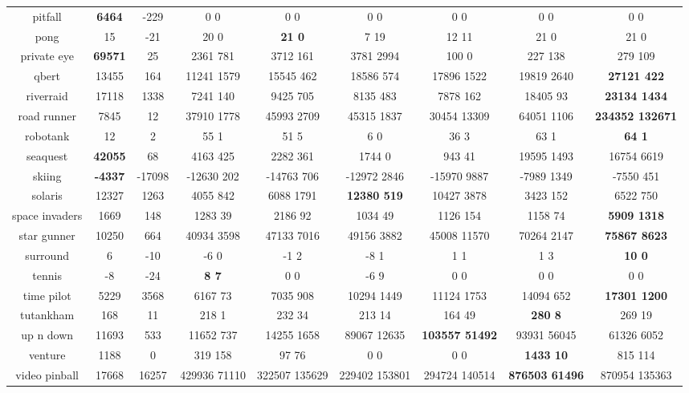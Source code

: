 \documentclass{article}
\begin{document}
\begin{table}[!ht]
\begin{tabular}{|c|c|c|c|c|c|c|c|c|}
 pitfall & \bf{6464} & -229 & 0  0 & 0  0 & 0  0 & 0  0 & 0  0 & 0  0 \\
 pong & 15 & -21 & 20  0 & \bf{21  0} & 7  19 & 12  11 & 21  0 & 21  0 \\
 private eye & \bf{69571} & 25 & 2361  781 & 3712  161 & 3781  2994 & 100  0 & 227  138 & 279  109 \\
 qbert & 13455 & 164 & 11241  1579 & 15545  462 & 18586  574 & 17896  1522 & 19819  2640 & \bf{27121  422} \\
 riverraid & 17118 & 1338 & 7241  140 & 9425  705 & 8135  483 & 7878  162 & 18405  93 & \bf{23134  1434} \\
 road runner & 7845 & 12 & 37910  1778 & 45993  2709 & 45315  1837 & 30454  13309 & 64051  1106 & \bf{234352  132671} \\
 robotank & 12 & 2 & 55  1 & 51  5 & 6  0 & 36  3 & 63  1 & \bf{64  1} \\
 seaquest & \bf{42055} & 68 & 4163  425 & 2282  361 & 1744  0 & 943  41 & 19595  1493 & 16754  6619 \\
 skiing & \bf{-4337} & -17098 & -12630  202 & -14763  706 & -12972  2846 & -15970  9887 & -7989  1349 & -7550  451 \\
 solaris & 12327 & 1263 & 4055  842 & 6088  1791 & \bf{12380  519} & 10427  3878 & 3423  152 & 6522  750 \\
 space invaders & 1669 & 148 & 1283  39 & 2186  92 & 1034  49 & 1126  154 & 1158  74 & \bf{5909  1318} \\
 star gunner & 10250 & 664 & 40934  3598 & 47133  7016 & 49156  3882 & 45008  11570 & 70264  2147 & \bf{75867  8623} \\
 surround & 6 & -10 & -6  0 & -1  2 & -8  1 & 1  1 & 1  3 & \bf{10  0} \\
 tennis & -8 & -24 & \bf{8  7} & 0  0 & -6  9 & 0  0 & 0  0 & 0  0 \\
 time pilot & 5229 & 3568 & 6167  73 & 7035  908 & 10294  1449 & 11124  1753 & 14094  652 & \bf{17301  1200} \\
 tutankham & 168 & 11 & 218  1 & 232  34 & 213  14 & 164  49 & \bf{280  8} & 269  19 \\
 up n down & 11693 & 533 & 11652  737 & 14255  1658 & 89067  12635 & \bf{103557  51492} & 93931  56045 & 61326  6052 \\
 venture & 1188 & 0 & 319  158 & 97  76 & 0  0 & 0  0 & \bf{1433  10} & 815  114 \\
 video pinball & 17668 & 16257 & 429936  71110 & 322507  135629 & 229402  153801 & 294724  140514 & \bf{876503  61496} & 870954  135363 \\

\end{tabular}
\end{table}
\end{document}
